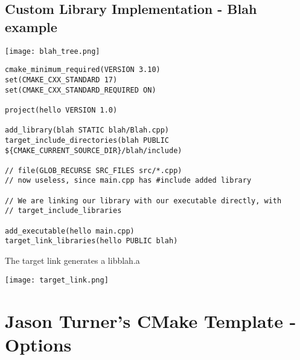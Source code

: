 \subsection{Custom Library Implementation - Blah example}

\begin{center}
    \texttt{[image: blah\_tree.png]}
\end{center}

\begin{verbatim}
cmake_minimum_required(VERSION 3.10)
set(CMAKE_CXX_STANDARD 17)
set(CMAKE_CXX_STANDARD_REQUIRED ON)

project(hello VERSION 1.0)

add_library(blah STATIC blah/Blah.cpp)
target_include_directories(blah PUBLIC ${CMAKE_CURRENT_SOURCE_DIR}/blah/include)

// file(GLOB_RECURSE SRC_FILES src/*.cpp)
// now useless, since main.cpp has #include added library

// We are linking our library with our executable directly, with
// target_include_libraries

add_executable(hello main.cpp)
target_link_libraries(hello PUBLIC blah)
\end{verbatim}

The target link generates a libblah.a

\begin{center}
    \texttt{[image: target\_link.png]}
\end{center}

\section{Jason Turner's CMake Template - Options}

